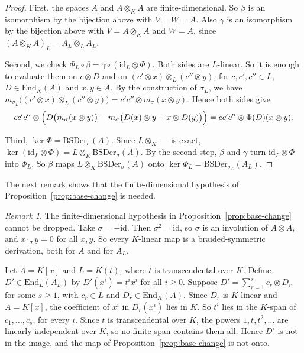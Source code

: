 \documentclass[]{interact}
\theoremstyle{plain}
\theoremstyle{definition}
\theoremstyle{remark}
\newtheorem{remark}[theorem]{Remark}
\newcommand{\BSDer}{\mathrm{BSDer}}
\begin{document}
\begin{proof}
First, the spaces $A$ and $A \otimes_K A$ are finite-dimensional.
So $\beta$ is an isomorphism by the bijection above with $V = W = A$.
Also $\gamma$ is an isomorphism by the bijection above with $V = A \otimes_K A$ and $W = A$, since $(A \otimes_K A)_L = A_L \otimes_L A_L$.

Second, we check $\Phi_L \circ \beta = \gamma \circ (\mathrm{id}_L \otimes \Phi)$.
Both sides are $L$-linear.
So it is enough to evaluate them on $c \otimes D$ and on $(c' \otimes x) \otimes_L (c'' \otimes y)$, for $c, c', c'' \in L$, $D \in \mathrm{End}_K(A)$ and $x, y \in A$.
By the construction of $\sigma_L$, we have $m_{\sigma_L}\bigl((c' \otimes x) \otimes_L (c'' \otimes y)\bigr) = c'c'' \otimes m_\sigma(x \otimes y)$.
Hence both sides give
\[
cc'c'' \otimes \Bigl(D\bigl(m_\sigma(x \otimes y)\bigr) - m_\sigma\bigl(D(x) \otimes y + x \otimes D(y)\bigr)\Bigr) = cc'c'' \otimes \Phi(D)(x \otimes y).
\]

Third, $\ker \Phi = \BSDer_\sigma(A)$.
Since $L \otimes_K -$ is exact, $\ker(\mathrm{id}_L \otimes \Phi) = L \otimes_K \BSDer_\sigma(A)$.
By the second step, $\beta$ and $\gamma$ turn $\mathrm{id}_L \otimes \Phi$ into $\Phi_L$.
So $\beta$ maps $L \otimes_K \BSDer_\sigma(A)$ onto $\ker \Phi_L = \BSDer_{\sigma_L}(A_L)$.
\end{proof}


The next remark shows that the finite-dimensional hypothesis of Proposition~\ref{prop:base-change} is needed.

\begin{remark}\label{rem:finite-needed}
The finite-dimensional hypothesis in Proposition~\ref{prop:base-change} cannot be dropped.
Take $\sigma = -\mathrm{id}$.
Then $\sigma^2 = \mathrm{id}$, so $\sigma$ is an involution of $A \otimes A$, and $x \cdot_\sigma y = 0$ for all $x, y$.
So every $K$-linear map is a braided-symmetric derivation, both for $A$ and for $A_L$.

Let $A = K[x]$ and $L = K(t)$, where $t$ is transcendental over $K$.
Define $D' \in \mathrm{End}_L(A_L)$ by $D'(x^i) = t^i x^i$ for all $i \geq 0$.
Suppose $D' = \sum_{r=1}^s c_r \otimes D_r$ for some $s \geq 1$, with $c_r \in L$ and $D_r \in \mathrm{End}_K(A)$.
Since $D_r$ is $K$-linear and $A = K[x]$, the coefficient of $x^i$ in $D_r(x^i)$ lies in $K$.
So $t^i$ lies in the $K$-span of $c_1, \dots, c_s$, for every $i$.
Since $t$ is transcendental over $K$, the powers $1, t, t^2, \dots$ are linearly independent over $K$, so no finite span contains them all.
Hence $D'$ is not in the image, and the map of Proposition~\ref{prop:base-change} is not onto.
\end{remark}
\end{document}
